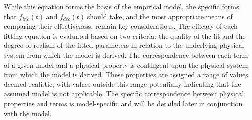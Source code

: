 

\noindent While this equation forms the basis of the empirical model, the specific forms that $f_{inc}(t)$ and $f_{dec}(t)$ should take, and the most appropriate means of comparing their effectiveness, remain key considerations. The efficacy of each fitting equation is evaluated based on two criteria: the quality of the fit and the degree of realism of the fitted parameters in relation to the underlying physical system from which the model is derived. The correspondence between each term of a given model and a physical property is contingent upon the physical system from which the model is derived. These properties are assigned a range of values deemed realistic, with values outside this range potentially indicating that the assumed model is not applicable. The specific correspondence between physical properties and terms is model-specific and will be detailed later in conjunction with the model. \\



